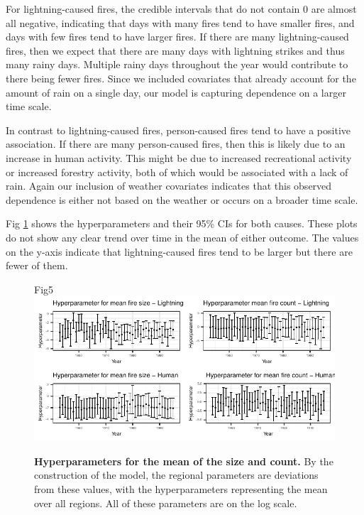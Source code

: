 \documentclass[10pt,letterpaper]{article}
\begin{document}
For lightning-caused fires, the credible intervals that do not contain 0
are almost all negative, indicating that days with many fires tend to
have smaller fires, and days with few fires tend to have larger fires.
If there are many lightning-caused fires, then we expect that there are
many days with lightning strikes and thus many rainy days. Multiple
rainy days throughout the year would contribute to there being fewer
fires. Since we included covariates that already account for the amount
of rain on a single day, our model is capturing dependence on a larger
time scale.

In contrast to lightning-caused fires, person-caused fires tend to have
a positive association. If there are many person-caused fires, then this
is likely due to an increase in human activity. This might be due to
increased recreational activity or increased forestry activity, both of
which would be associated with a lack of rain. Again our inclusion of
weather covariates indicates that this observed dependence is either not
based on the weather or occurs on a broader time scale.

Fig \ref{hypers} shows the hyperparameters and their 95\% CIs for both
causes. These plots do not show any clear trend over time in the mean of
either outcome. The values on the y-axis indicate that lightning-caused
fires tend to be larger but there are fewer of them.

\begin{figure}[h!]
\centering
Fig5
\includegraphics[width=\textwidth]{Joint_Count_Files/hypers-1.pdf}
\caption{\label{hypers}\textbf{Hyperparameters for the mean of the size and
count.} By the construction of the model, the regional parameters are
deviations from these values, with the hyperparameters representing the
mean over all regions. All of these parameters are on the log scale.}
\end{figure}
\end{document}
